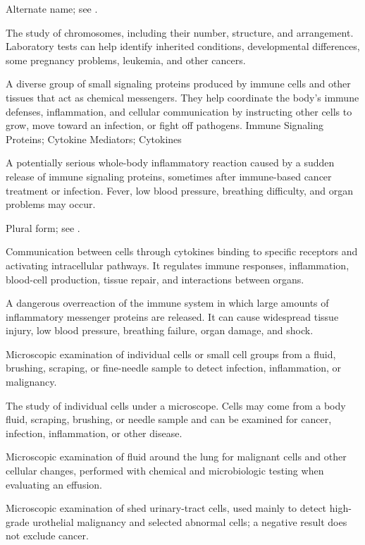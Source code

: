  Alternate name; see .

 The study of chromosomes, including their number, structure, and arrangement. Laboratory tests can help identify inherited conditions, developmental differences, some pregnancy problems, leukemia, and other cancers.

 A diverse group of small signaling proteins produced by immune cells and other tissues that act as chemical messengers. They help coordinate the body's immune defenses, inflammation, and cellular communication by instructing other cells to grow, move toward an infection, or fight off pathogens.
\synonyms
Immune Signaling Proteins; Cytokine Mediators; Cytokines

 A potentially serious whole-body inflammatory reaction caused by a sudden release of immune signaling proteins, sometimes after immune-based cancer treatment or infection. Fever, low blood pressure, breathing difficulty, and organ problems may occur.

 Plural form; see .

 Communication between cells through cytokines binding to specific receptors and activating intracellular pathways. It regulates immune responses, inflammation, blood-cell production, tissue repair, and interactions between organs.

 A dangerous overreaction of the immune system in which large amounts of inflammatory messenger proteins are released. It can cause widespread tissue injury, low blood pressure, breathing failure, organ damage, and shock.

 Microscopic examination of individual cells or small cell groups from a fluid, brushing, scraping, or fine-needle sample to detect infection, inflammation, or malignancy.

 The study of individual cells under a microscope. Cells may come from a body fluid, scraping, brushing, or needle sample and can be examined for cancer, infection, inflammation, or other disease.

 Microscopic examination of fluid around the lung for malignant cells and other cellular changes, performed with chemical and microbiologic testing when evaluating an effusion.

 Microscopic examination of shed urinary-tract cells, used mainly to detect high-grade urothelial malignancy and selected abnormal cells; a negative result does not exclude cancer.

